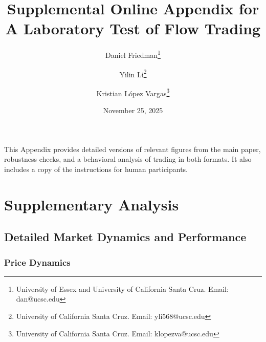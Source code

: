 \documentclass[12pt]{article}
\title{Supplemental Online Appendix for \\
A Laboratory Test of Flow Trading}
\author{
  Daniel Friedman\thanks{
  University of Essex and University of California Santa Cruz. Email: dan@ucsc.edu}
\and
  Yilin Li\thanks{
  University of California Santa Cruz. Email: yli568@ucsc.edu}
\and
  Kristian L\'opez Vargas\thanks{
  University of California Santa Cruz. Email: klopezva@ucsc.edu}}
\date{November 25, 2025}
\begin{document}
\maketitle

\begin{singlespace}
\appendix
\renewcommand\thesubsection{\thesection.\arabic{subsection}}
\setcounter{subsection}{0}
\renewcommand\thesubsubsection{\thesubsection.\arabic{subsubsection}}
\setcounter{section}{1}  %
\setcounter{page}{1}

\newpage

This Appendix provides detailed versions of relevant figures from the main paper, robustness checks, and a behavioral analysis of trading in both formats. 
It also includes a copy of the instructions for human participants. 

\section{Supplementary Analysis} \label{app_supplementary_analysis}

\subsection{Detailed Market Dynamics and Performance}

\subsubsection{Price Dynamics}


\end{singlespace}
\end{document}

